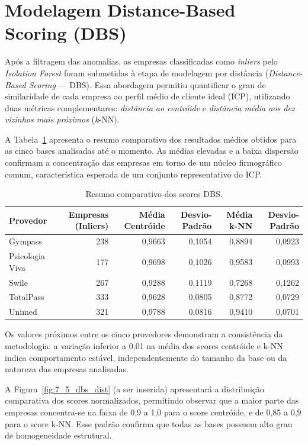 \section{Modelagem Distance-Based Scoring (DBS)}

Após a filtragem das anomalias, as empresas classificadas como \textit{inliers} pelo \textit{Isolation Forest} foram submetidas à etapa de modelagem por distância (\textit{Distance-Based Scoring} — DBS). Essa abordagem permitiu quantificar o grau de similaridade de cada empresa ao perfil médio de cliente ideal (ICP), utilizando duas métricas complementares: \textit{distância ao centróide} e \textit{distância média aos dez vizinhos mais próximos} (\textit{k}-NN).

A Tabela~\ref{tab:7_5_dbs_all} apresenta o resumo comparativo dos resultados médios obtidos para as cinco bases analisadas até o momento. As médias elevadas e a baixa dispersão confirmam a concentração das empresas em torno de um núcleo firmográfico comum, característica esperada de um conjunto representativo do ICP.

\begin{table}[H]
\centering
\caption{Resumo comparativo dos scores DBS.}
\label{tab:7_5_dbs_all}
\begin{tabular}{lrrrrr}
\toprule
\textbf{Provedor} & \textbf{Empresas (Inliers)} & \textbf{Média Centróide} & \textbf{Desvio-Padrão} & \textbf{Média k-NN} & \textbf{Desvio-Padrão} \\
\midrule
Gympass & 238 & 0,9663 & 0,1054 & 0,8894 & 0,0923 \\
Psicologia Viva & 177 & 0,9698 & 0,1026 & 0,9583 & 0,0993 \\
Swile & 267 & 0,9288 & 0,1119 & 0,7268 & 0,1262 \\
TotalPass & 333 & 0,9628 & 0,0805 & 0,8772 & 0,0729 \\
Unimed & 321 & 0,9788 & 0,0816 & 0,9410 & 0,0701 \\
\bottomrule
\end{tabular}
\end{table}

Os valores próximos entre os cinco provedores demonstram a consistência da metodologia: a variação inferior a 0,01 na média dos scores centróide e k-NN indica comportamento estável, independentemente do tamanho da base ou da natureza das empresas analisadas. 

A Figura~\ref{fig:7_5_dbs_dist} (a ser inserida) apresentará a distribuição comparativa dos scores normalizados, permitindo observar que a maior parte das empresas concentra-se na faixa de 0,9 a 1,0 para o score centróide, e de 0,85 a 0,9 para o score k-NN. Esse padrão confirma que todas as bases possuem alto grau de homogeneidade estrutural.

